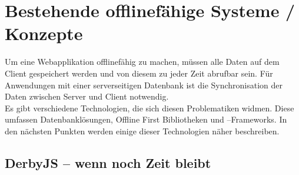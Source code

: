 %
%
\chapter{\label{chap:state}Bestehende offlinefähige Systeme / Konzepte}
Um eine Webapplikation offlinefähig zu machen, müssen alle Daten auf dem Client gespeichert werden und von diesem zu jeder Zeit abrufbar sein.
Für Anwendungen mit einer serverseitigen Datenbank ist die Synchronisation der Daten zwischen Server und Client notwendig.\\
Es gibt verschiedene Technologien, die sich diesen Problematiken widmen.
Diese umfassen Datenbanklösungen, Offline First Bibliotheken und --Frameworks. In den nächsten Punkten werden einige dieser Technologien näher beschreiben.
%
%

%
%

%
%

%
%

%
%

%
\section{DerbyJS -- wenn noch Zeit bleibt}
